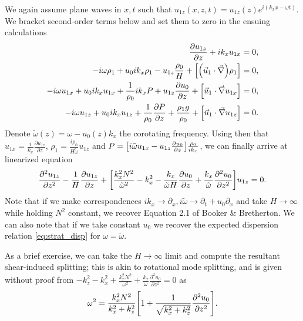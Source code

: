 \documentclass[11pt,
        usenames, %
        dvipsnames %
    ]{report}
\newcommand*{\pd}[2]{\frac{\partial#1}{\partial#2}}
\newcommand*{\ptd}[2]{\frac{\partial^2 #1}{\partial#2^2}}
\DeclarePairedDelimiter\p{\lparen}{\rparen}
\DeclarePairedDelimiter\s{\lbrack}{\rbrack}
\begin{document}
We again assume plane waves in $x, t$ such that $u_{1z}(x, z, t) =
u_{1z}(z)e^{i(k_xx - \omega t)}$. We bracket second-order terms below and set
them to zero in the ensuing calculations
\begin{subequations}
    \begin{align}
        \pd{u_{1z}}{z} + ik_xu_{1x} &= 0,\\
        -i\omega \rho_1 + u_0ik_x\rho_1
            - u_{1z}\frac{\rho_0}{H}
            + \s*{\p*{\vec{u}_1 \cdot \vec{\nabla}} \rho_1} &= 0,\\
        -i\omega u_{1x} + u_0ik_x u_{1x}
            + \frac{1}{\rho_0}ik_xP + u_{1z}\pd{u_0}{z}
            + \s*{\vec{u}_1 \cdot \vec{\nabla} u_{1x}} &= 0,\\
        -i\omega u_{1z} + u_0ik_x u_{1z}
            + \frac{1}{\rho_0}\pd{P}{z} + \frac{\rho_1 g}{\rho_0}
            + \s*{\vec{u}_1 \cdot \vec{\nabla} u_{1z}} &= 0.\\
    \end{align}
\end{subequations}
Denote $\tilde{\omega}(z) = \omega - u_0(z)k_x$ the corotating frequency. Using
then that $u_{1x} = \frac{i}{k_x}\pd{u_{1z}}{z}$, $\rho_1 = \frac{i
\rho_0}{H\tilde{\omega}} u_{1z}$ and $P = \s*{i\tilde{\omega}u_{1x} - u_{1z}
\pd{u_0}{z}} \frac{\rho_0}{ik_x}$, we can finally arrive at linearized equation
\begin{equation}
    \ptd{u_{1z}}{z} - \frac{1}{H}\pd{u_{1z}}{z} + \s*{
        \frac{k_x^2N^2}{\tilde{\omega}^2}
            - k_x^2
            - \frac{k_x}{\tilde{\omega}H}\pd{u_0}{z}
            + \frac{k_x}{\tilde{\omega}} \ptd{u_0}{z}
    } u_{1z} = 0. \label{eq:shear_lin_uz}
\end{equation}
Note that if we make correspondences $ik_x \to \partial_x, i\tilde{\omega} \to
\partial_t + u_0\partial_x$ and take $H \to \infty$ while holding $N^2$
constant, we recover Equation 2.1 of Booker \& Bretherton. We can also note that
if we take constant $u_0$ we recover the expected dispersion relation
\autoref{eq:strat_disp} for $\omega = \tilde{\omega}$.

As a brief exercise, we can take the $H \to \infty$ limit and compute the
resultant shear-induced splitting; this is akin to rotational mode splitting,
and is given without proof from $-k_z^2 - k_x^2 + \frac{k_x^2N^2}{\omega^2} +
\frac{k_x}{\omega}\ptd{u_0}{z} = 0$ as
\begin{equation}
    \omega^2 = \frac{k_x^2 N^2}{k_x^2 + k_z^2}\s*{1 + \frac{1}{\sqrt{k_x^2 +
        k_z^2}} \ptd{u_0}{z}}.
\end{equation}
\end{document}
